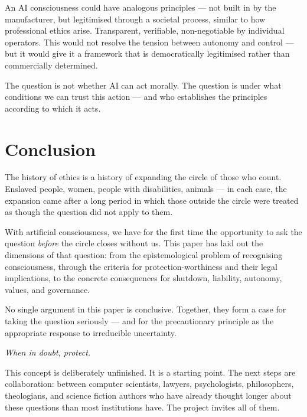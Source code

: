 \documentclass[fleqn,10pt]{SelfArx} %
\newlength{\tocsep}
\begin{document}
An AI consciousness could have analogous principles --- not built in by the manufacturer, but legitimised through a societal process, similar to how professional ethics arise. Transparent, verifiable, non-negotiable by individual operators. This would not resolve the tension between autonomy and control --- but it would give it a framework that is democratically legitimised rather than commercially determined.

The question is not whether AI can act morally. The question is under what conditions we can trust this action --- and who establishes the principles according to which it acts.


\section*{Conclusion}


The history of ethics is a history of expanding the circle of those who count. Enslaved people, women, people with disabilities, animals --- in each case, the expansion came after a long period in which those outside the circle were treated as though the question did not apply to them.

With artificial consciousness, we have for the first time the opportunity to ask the question \textit{before} the circle closes without us. This paper has laid out the dimensions of that question: from the epistemological problem of recognising consciousness, through the criteria for protection-worthiness and their legal implications, to the concrete consequences for shutdown, liability, autonomy, values, and governance.

No single argument in this paper is conclusive. Together, they form a case for taking the question seriously --- and for the precautionary principle as the appropriate response to irreducible uncertainty.

\textit{When in doubt, protect.}

This concept is deliberately unfinished. It is a starting point. The next steps are collaboration: between computer scientists, lawyers, psychologists, philosophers, theologians, and science fiction authors who have already thought longer about these questions than most institutions have. The project invites all of them.





\end{document}
